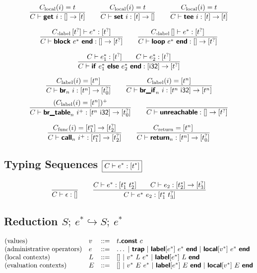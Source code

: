 \documentclass[a4paper]{scrartcl}
\newcommand\f[1]{\ensuremath{\mathop{\mathrm{#1\null}}\nolimits}\xspace}
\newcommand\evalto{\hookrightarrow}
\newcommand\K[1]{\ensuremath{\textsf{#1}}}
\newcommand\KK[1]{\ensuremath{\K{\textbf{#1}}}}
\begin{document}
$$
\frac{
  C_{\f{local}}(i) = t
}{
  C \vdash \KK{get}~i : [] \to [t]
}
\qquad
\frac{
  C_{\f{local}}(i) = t
}{
  C \vdash \KK{set}~i : [t] \to []
}
\qquad
\frac{
  C_{\f{local}}(i) = t
}{
  C \vdash \KK{tee}~i : [t] \to [t]
}
$$

$$
\frac{
  C,_{\f{label}}[t^?] \vdash e^\ast : [t^?]\orbot
}{
  C \vdash \KK{block}~e^\ast~\KK{end} : [] \to [t^?]\orbot
}
\qquad
\frac{
  C,_{\f{label}}[] \vdash e^\ast : [t^?]\orbot
}{
  C \vdash \KK{loop}~e^\ast~\KK{end} : [] \to [t^?]\orbot
}
$$

$$
\frac{
  C \vdash e_1^\ast : [t^?]\orbot
  \qquad
  C \vdash e_2^\ast : [t^?]\orbot
}{
  C \vdash \KK{if}~e_1^\ast~\KK{else}~e_2^\ast~\KK{end} : [\K{i32}] \to [t^?]\orbot
}
$$

$$
\frac{
  C_{\f{label}}(i) = [t^n]
}{
  C \vdash \KK{br}_n~i : [t^n] \to \poly{t_0^?}
}
\qquad
\frac{
  C_{\f{label}}(i) = [t^n]
}{
  C \vdash \KK{br\_if}_n~i : [t^n~\K{i32}] \to [t^n]
}
$$
$$
\frac{
  (C_{\f{label}}(i) = [t^n])^+
}{
  C \vdash \KK{br\_table}_n~i^+ : [t^n~\K{i32}] \to \poly{t_0^?}
}
\qquad
\frac{
}{
  C \vdash \KK{unreachable} : [] \to \poly{t^?}
}
$$

$$
\frac{
  C_{\f{func}}(i) = [t_1^n] \to [t_2^?]
}{
  C \vdash \KK{call}_n~i^+ : [t_1^n] \to [t_2^?]
}
\qquad
\frac{
  C_{\f{return}} = [t^n]
}{
  C \vdash \KK{return}_n : [t^n] \to \poly{t_0^?}
}
$$


\subsection*{Typing Sequences \hfill $\boxed{C \vdash e^\ast : [t^\ast]}$}

$$
\frac{
}{
  C \vdash \epsilon : []
}
\qquad
\frac{
  C \vdash e^\ast : [t_1^\ast~t_2^\ast]
  \qquad
  C \vdash e_2 : [t_2^\ast] \to [t_3^?]\orbot
}{
  C \vdash e^\ast~e_2 : [t_1^\ast~t_3^?]\orbot
}
\botrule{
\qquad
\frac{
  C \vdash e^\ast : \bot
  \qquad
  C \vdash e_2 : [t_2^\ast] \to [t_3^?]/\bot
}{
  C \vdash e^\ast~e_2 : \bot
}
}
$$


\subsection*{Reduction \hfill $\boxed{S;~e^\ast \evalto S;~e^\ast}$}

$$
\begin{array}{@{}llcl@{}}
\text{(values)} & v &::=&
  t\KK{.const}~c \\
\text{(administrative operators)} & e &::=&
  \dots ~|~
  \KK{trap} ~|~
  \KK{label}[e^\ast]~e^\ast~\KK{end} ~|~
  \KK{local}[v^\ast]~e^\ast~\KK{end} \\
\text{(local contexts)} & L &::=&
  [] ~|~
  v^\ast~L~e^\ast ~|~
  \KK{label}[e^\ast]~L~\KK{end} \\
\text{(evaluation contexts)} & E &::=&
  [] ~|~
  v^\ast~E~e^\ast ~|~
  \KK{label}[e^\ast]~E~\KK{end} ~|~
  \KK{local}[v^\ast]~E~\KK{end} \\
\end{array}
$$
\end{document}
